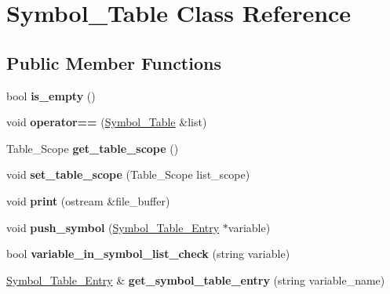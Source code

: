 \hypertarget{classSymbol__Table}{}\section{Symbol\+\_\+\+Table Class Reference}
\label{classSymbol__Table}
\subsection*{Public Member Functions}
\begin{DoxyCompactItemize}
\item 
\mbox{\label{classSymbol__Table_a63aac65e88dc4e4c20404bce2e03fe60}} 
bool {\bfseries is\+\_\+empty} ()
\item 
\mbox{\label{classSymbol__Table_aca0f829ca186ae8b0eed12edfe0bb6e6}} 
void {\bfseries operator==} (\hyperlink{classSymbol__Table}{Symbol\+\_\+\+Table} \&list)
\item 
\mbox{\label{classSymbol__Table_a891faac11bb15cbb18079db954bd9e99}} 
Table\+\_\+\+Scope {\bfseries get\+\_\+table\+\_\+scope} ()
\item 
\mbox{\label{classSymbol__Table_aa80657ee04d5164c1e46717517f1261c}} 
void {\bfseries set\+\_\+table\+\_\+scope} (Table\+\_\+\+Scope list\+\_\+scope)
\item 
\mbox{\label{classSymbol__Table_a1841630617ca4f5079be8d97b774261c}} 
void {\bfseries print} (ostream \&file\+\_\+buffer)
\item 
\mbox{\label{classSymbol__Table_ad0471eaa19f9f3211a8f59cd3c4764ee}} 
void {\bfseries push\+\_\+symbol} (\hyperlink{classSymbol__Table__Entry}{Symbol\+\_\+\+Table\+\_\+\+Entry} $\ast$variable)
\item 
\mbox{\label{classSymbol__Table_a0b041c37e28aeccb705fa474463937e0}} 
bool {\bfseries variable\+\_\+in\+\_\+symbol\+\_\+list\+\_\+check} (string variable)
\item 
\mbox{\label{classSymbol__Table_af00561c745b477b066d78ce29799127d}} 
\hyperlink{classSymbol__Table__Entry}{Symbol\+\_\+\+Table\+\_\+\+Entry} \& {\bfseries get\+\_\+symbol\+\_\+table\+\_\+entry} (string variable\+\_\+name)

\end{DoxyCompactItemize}
